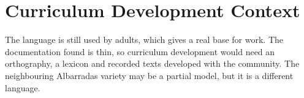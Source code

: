 \documentclass[12pt]{article}
\begin{document}
\section{Curriculum Development Context}
The language is still used by adults, which gives a real base for work. The documentation found is thin, so curriculum development would need an orthography, a lexicon and recorded texts developed with the community. The neighbouring Albarradas variety may be a partial model, but it is a different language.
\end{document}
